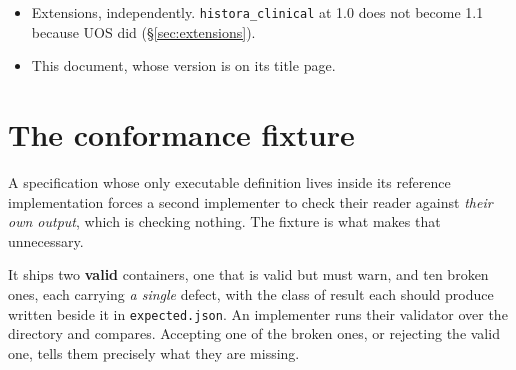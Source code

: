 \documentclass[11pt,a4paper]{article}
\newcommand{\code}[1]{\texttt{\small #1}}
\begin{document}
\begin{itemize}
  Both moves were symptoms rather than the disease: one name was carrying both jobs, so every
  correction to a draft had to violate the rule above in order to keep the \code{\$id}
  resolving. With the two separated, the rule needs no exception --- which is why the
  exception a previous revision of this section carried has been withdrawn. A validator check
  (\S\ref{sec:conformance}) compares what a tag publishes against the file in the tree, so a
  tag that drifts from its schema is found before anybody downloads it.
  \item Extensions, independently. \code{histora\_clinical} at 1.0 does not become 1.1 because
  UOS did (\S\ref{sec:extensions}).
  \item This document, whose version is on its title page.
\end{itemize}

\section{The conformance fixture}\label{sec:fixture}

A specification whose only executable definition lives inside its reference implementation
forces a second implementer to check their reader against \emph{their own output}, which is
checking nothing. The fixture is what makes that unnecessary.

It ships two \textbf{valid} containers, one that is valid but must warn, and ten broken ones, each carrying \emph{a single}
defect, with the class of result each should produce written beside it in
\code{expected.json}. An implementer runs their validator over the directory and compares.
Accepting one of the broken ones, or rejecting the valid one, tells them precisely what
they are missing.
\end{document}
